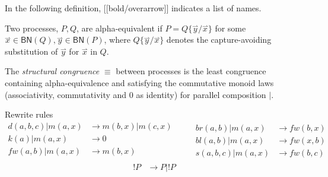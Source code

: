 \documentclass{llncs}
\newcommand{\pzero}{\mathbin{0}}
\newcommand{\scong}{\mathbin{\equiv}}
\newcommand{\boundnames}[1]{\mathbin{\mathsf{BN}(#1)}}
\newcommand{\red}{\rightarrow}
\newcommand{\vect}[1]{\stackrel{\rightharpoonup}{#1}}
\begin{document}
In the following definition, [[bold/overarrow]] indicates a list of names.

\begin{definition}
Two processes, $P,Q$, are alpha-equivalent if $P = Q\{\vect{y}/\vect{x}\}$ for
some $\vect{x} \in \boundnames{Q},\vect{y} \in \boundnames{P}$, where $Q\{\vect{y}/\vect{x}\}$
denotes the capture-avoiding substitution of $\vect{y}$ for $\vect{x}$ in $Q$.
\end{definition}

\begin{definition}
  The {\em structural congruence} $\equiv$
  between processes \cite{SangiorgiWalker} is the least congruence containing
  alpha-equivalence and satisfying the commutative monoid laws
  (associativity, commutativity and $\pzero$ as identity) for parallel
  composition $|$.
\end{definition}

Rewrite rules
\[\begin{array}{rl}
  d(a,b,c) | m(a,x) & \red m(b,x) | m(c,x) \\
  k(a) | m(a,x) & \red 0 \\
  fw(a,b) | m(a,x) & \red m(b,x) \\
\end{array} \quad \quad
\begin{array}{rl}
  br(a,b) | m(a,x) & \red fw(b,x) \\
  bl(a,b) | m(a,x) & \red fw(x,b) \\
  s(a,b,c) | m(a,x) & \red fw(b,c)
\end{array}\]
\[\begin{array}{rl}
  !P & \red P|!P \\
\end{array}\]
\end{document}

